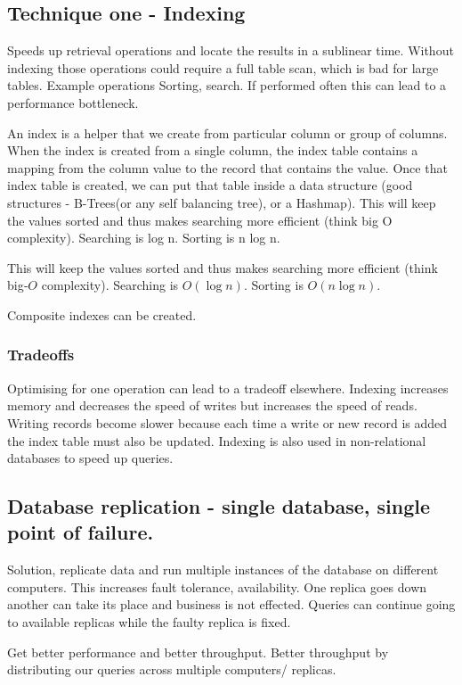 \subsection{Technique one - Indexing}
Speeds up retrieval operations and locate the results in a sublinear time.
Without indexing those operations could require a full table scan, which is bad for large tables.
Example operations
Sorting, search.
If performed often this can lead to a performance bottleneck.

An index is a helper that we create from particular column or group of columns.
When the index is created from a single column, the index table contains a mapping from the column value to the record that contains the value.
Once that index table is created, we can put that table inside a data structure (good structures - B-Trees(or any self balancing tree), or a Hashmap).
This will keep the values sorted and thus makes searching more efficient (think big O complexity).
Searching is log n.
Sorting is n log n.

This will keep the values sorted and thus makes searching more efficient (think big‑$O$ complexity).
Searching is $O(\log n)$.
Sorting is $O(n \log n)$.

Composite indexes can be created.


\subsubsection{Tradeoffs}
Optimising for one operation can lead to a tradeoff elsewhere.
Indexing increases memory and decreases the speed of writes but increases the speed of reads.
Writing records become slower because each time a write or new record is added the index table must also be updated.
Indexing is also used in non-relational databases to speed up queries.

\subsection{Database replication - single database, single point of failure.}
Solution, replicate data and run multiple instances of the database on different computers.
This increases fault tolerance, availability.
One replica goes down another can take its place and business is not effected.
Queries can continue going to available replicas while the faulty replica is fixed.

Get better performance and better throughput.
Better throughput by distributing our queries across multiple computers/ replicas.

